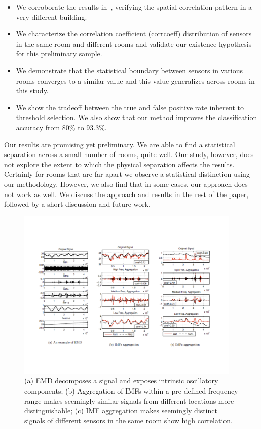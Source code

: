 \begin{itemize}
\item We corroborate the results in~\cite{IOT}, verifying the spatial correlation pattern in a very different building.
\item We characterize the correlation coefficient (corrcoeff) distribution of sensors in the same room and different rooms and validate our existence hypothesis for this preliminary sample.
\item We demonstrate that the statistical boundary between sensors in various rooms converges to a similar value and this value generalizes across rooms in this study.
\item We show the tradeoff between the true and false positive rate inherent to threshold selection. We also show that our method improves the classification accuracy from 80\% to 93.3\%.
\end{itemize}

Our results are promising yet preliminary.  We are able to find a statistical separation across a small number of rooms, quite well.
Our study, however, does not explore the extent to which the physical separation affects the results.  Certainly for rooms that
are far apart we observe a statistical distinction using our methodology.  However, we also find that in some cases, our approach
does not work as well.  We discuss the approach and results in the rest of the paper, followed by a short discussion and future work.

\begin{figure}[ht!]
\centering
    \includegraphics[width=0.95\textwidth]{figs/IMFReAggExample}
\caption{(a) EMD decomposes a signal and exposes intrinsic oscillatory components; (b) Aggregation of IMFs within a pre-defined frequency range makes seemingly similar signals from different locations more distinguishable; (c) IMF aggregation makes seemingly distinct signals of different sensors in the same room show high correlation.}
\end{figure}

